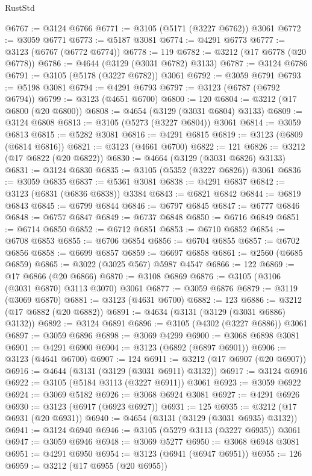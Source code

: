 \begin{lexlean}{RustStd}
\begin{coremodule}
@6767 := @3124 @6766
@6771 := @3105 (@5171 (@3227 @6762)) @3061
@6772 := @3059 @6771
@6773 := @5187 @3081
@6774 := @4291 @6773
@6777 := @3123 (@6767 (@6772 @6774))
@6778 := 119
@6782 := @3212 (@17 @6778 (@20 @6778))
@6786 := @4644 (@3129 (@3031 @6782) @3133)
@6787 := @3124 @6786
@6791 := @3105 (@5178 (@3227 @6782)) @3061
@6792 := @3059 @6791
@6793 := @5198 @3081
@6794 := @4291 @6793
@6797 := @3123 (@6787 (@6792 @6794))
@6799 := @3123 (@4651 @6700)
@6800 := 120
@6804 := @3212 (@17 @6800 (@20 @6800))
@6808 := @4654 (@3129 (@3031 @6804) @3133)
@6809 := @3124 @6808
@6813 := @3105 (@5273 (@3227 @6804)) @3061
@6814 := @3059 @6813
@6815 := @5282 @3081
@6816 := @4291 @6815
@6819 := @3123 (@6809 (@6814 @6816))
@6821 := @3123 (@4661 @6700)
@6822 := 121
@6826 := @3212 (@17 @6822 (@20 @6822))
@6830 := @4664 (@3129 (@3031 @6826) @3133)
@6831 := @3124 @6830
@6835 := @3105 (@5352 (@3227 @6826)) @3061
@6836 := @3059 @6835
@6837 := @5361 @3081
@6838 := @4291 @6837
@6842 := @3123 (@6831 (@6836 @6838)) @3384
@6843 := @6821 @6842
@6844 := @6819 @6843
@6845 := @6799 @6844
@6846 := @6797 @6845
@6847 := @6777 @6846
@6848 := @6757 @6847
@6849 := @6737 @6848
@6850 := @6716 @6849
@6851 := @6714 @6850
@6852 := @6712 @6851
@6853 := @6710 @6852
@6854 := @6708 @6853
@6855 := @6706 @6854
@6856 := @6704 @6855
@6857 := @6702 @6856
@6858 := @6699 @6857
@6859 := @6697 @6858
@6861 := @2560 (@6685 @6859)
@6865 := @3022 (@3025 @567) @5987 @4547
@6866 := 122
@6869 := @17 @6866 (@20 @6866)
@6870 := @3108 @6869
@6876 := @3105 (@3106 (@3031 @6870) @3113 @3070) @3061
@6877 := @3059 @6876
@6879 := @3119 (@3069 @6870)
@6881 := @3123 (@4631 @6700)
@6882 := 123
@6886 := @3212 (@17 @6882 (@20 @6882))
@6891 := @4634 (@3131 (@3129 (@3031 @6886) @3132))
@6892 := @3124 @6891
@6896 := @3105 (@4302 (@3227 @6886)) @3061
@6897 := @3059 @6896
@6898 := @3069 @4299
@6900 := @3068 @6898 @3081
@6901 := @4291 @6900
@6904 := @3123 (@6892 (@6897 @6901))
@6906 := @3123 (@4641 @6700)
@6907 := 124
@6911 := @3212 (@17 @6907 (@20 @6907))
@6916 := @4644 (@3131 (@3129 (@3031 @6911) @3132))
@6917 := @3124 @6916
@6922 := @3105 (@5184 @3113 (@3227 @6911)) @3061
@6923 := @3059 @6922
@6924 := @3069 @5182
@6926 := @3068 @6924 @3081
@6927 := @4291 @6926
@6930 := @3123 (@6917 (@6923 @6927))
@6931 := 125
@6935 := @3212 (@17 @6931 (@20 @6931))
@6940 := @4654 (@3131 (@3129 (@3031 @6935) @3132))
@6941 := @3124 @6940
@6946 := @3105 (@5279 @3113 (@3227 @6935)) @3061
@6947 := @3059 @6946
@6948 := @3069 @5277
@6950 := @3068 @6948 @3081
@6951 := @4291 @6950
@6954 := @3123 (@6941 (@6947 @6951))
@6955 := 126
@6959 := @3212 (@17 @6955 (@20 @6955))

\end{coremodule}
\end{lexlean}
